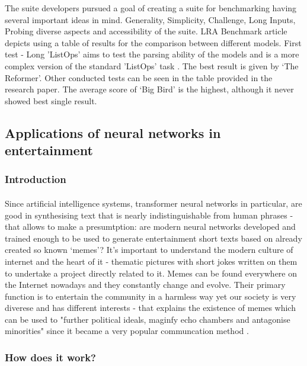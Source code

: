 \documentclass[12pt]{report}
\begin{document}
    The suite developers pursued a goal of creating a suite for benchmarking having several important ideas in mind. Generality, Simplicity, Challenge, Long Inputs, Probing diverse aspects and accessibility of the suite.
    LRA Benchmark article depicts using a table of results for the comparison between different models. First test - Long 'ListOps' aims to test the parsing ability of the models and is a more complex version of the standard 'ListOps' task \citep{ListOps}.
    The best result is given by `The Reformer'. Other conducted tests can be seen in the table provided in the research paper. The average score of `Big Bird' is the highest, although it never showed best single result.

    \subsection*{Applications of neural networks in entertainment}

    \subsubsection*{Introduction}
    \paragraph{}

    Since artificial intelligence systems, transformer neural networks in particular, are good in synthesising text that is nearly indistinguishable from human phrases - that allows to make a presumtption: are modern neural networks developed and trained enough to be used to generate
    entertainment short texts based on already created so known `memes'? It's important to understand the modern culture of internet and the heart of it - thematic pictures with short jokes written on them to undertake a project directly related to it.
    Memes can be found everywhere on the Internet nowadays and they constantly change and evolve. Their primary function is to entertain the community in a harmless way yet our society is very diverese and has different interests - that explains the existence of memes which can be used
    to "further political ideals, maginfy echo chambers and antagonise minorities" since it became a very popular communcation method \citep{dank_learning}. 

    \subsubsection{How does it work?}
\end{document}
